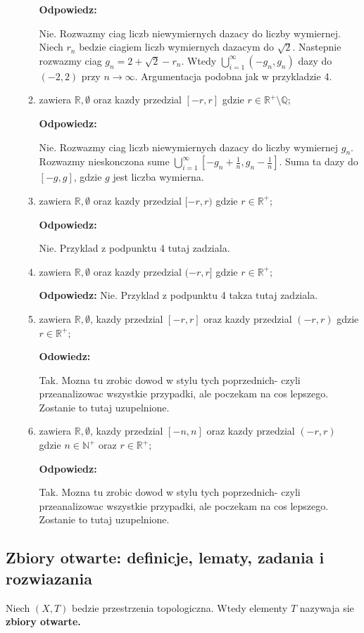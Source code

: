 \documentclass{article}
\begin{document}
\begin{enumerate}
\begin{enumerate}[label={$T_{\arabic*} :$}]
\textbf{Odpowiedz:}

        Nie. Rozwazmy ciag liczb niewymiernych dazacy do liczby wymiernej. Niech $r_{n}$ bedzie ciagiem liczb wymiernych dazacym do $\sqrt{2}$. Nastepnie rozwazmy ciag $g_{n} = 2+\sqrt{2} - r_{n}$. Wtedy $\bigcup\limits_{i=1}^{\infty}(-g_{n}, g_{n})$ dazy do $(-2,2)$ przy $n \rightarrow \infty$. Argumentacja podobna jak w przykladzie 4.
\item zawiera $\mathbb{R}, \emptyset$ oraz kazdy przedzial $[-r,r]$ gdzie $r \in {\mathbb{R}}^{+} \setminus \mathbb{Q}$;

\textbf{Odpowiedz:}

        Nie. Rozwazmy ciag liczb niewymiernych dazacy do liczby wymiernej $g_{n}$. Rozwazmy nieskonczona sume $\bigcup\limits_{i=1}^{\infty}[-g_{n} + \frac{1}{n}, g_{n} - \frac{1}{n}]$. Suma ta dazy do $[-g, g]$, gdzie $g$ jest liczba wymierna.
\item zawiera $\mathbb{R}, \emptyset$ oraz kazdy przedzial $[-r,r)$ gdzie $r \in {\mathbb{R}}^{+}$;

\textbf{Odpowiedz:}

Nie. Przyklad z podpunktu 4 tutaj zadziala.
\item zawiera $\mathbb{R}, \emptyset$ oraz kazdy przedzial $(-r,r]$ gdzie $r \in {\mathbb{R}}^{+}$;
 
    \textbf{Odpowiedz:}
Nie. Przyklad z podpunktu 4 takza tutaj zadziala.
\item zawiera $\mathbb{R}, \emptyset$, kazdy przedzial $[-r,r]$ oraz kazdy przedzial $(-r,r)$ gdzie $r \in {\mathbb{R}}^{+}$;

\textbf{Odowiedz:}

Tak. Mozna tu zrobic dowod w stylu tych poprzednich- czyli przeanalizowac wszystkie przypadki, ale poczekam na cos lepszego. Zostanie to tutaj uzupelnione.
\item zawiera $\mathbb{R}, \emptyset$, kazdy przedzial $[-n,n]$ oraz kazdy przedzial $(-r,r)$ gdzie $n \in {\mathbb{N}}^{+}$ oraz  $r \in {\mathbb{R}}^{+}$;

\textbf{Odpowiedz:}

 Tak. Mozna tu zrobic dowod w stylu tych poprzednich- czyli przeanalizowac wszystkie przypadki, ale poczekam na cos lepszego. Zostanie to tutaj uzupelnione.
\end{enumerate}


\end{enumerate}%

\subsection{Zbiory otwarte: definicje, lematy, zadania i rozwiazania}
\begin{tcolorbox}[colback=white!90!red,colframe=black!35!red,title=1.2.1 Definicja: Zbior otwarty- open set]

Niech $(X, T)$ bedzie przestrzenia topologiczna. Wtedy elementy $T$ nazywaja sie \textbf{zbiory otwarte.}

\end{tcolorbox}
\end{document}

